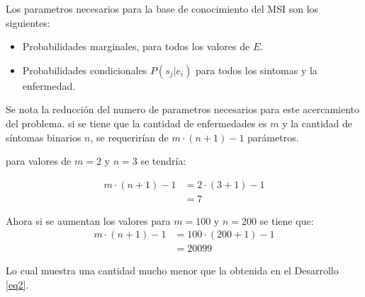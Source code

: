 \documentclass{article}
\begin{document}
Los parametros necesarios para la base de conocimiento del MSI son los
siguientes:
\begin{itemize}
	\item Probabilidades marginales, para todos los valores de $E$.
	\item Probabilidades condicionales $P(s_{j} | e_{i})$ para todos los sintomas
		y la enfermedad.
\end{itemize}

Se nota la reducción del numero de parametros necesarios para este acercamiento
del problema. si se tiene que la cantidad de enfermedades es $m$ y la cantidad
de síntomas binarios $n$, se requerirían de $m\cdot(n+1)-1$ parámetros.

para valores de $m=2$ y $n=3$ se tendría:

\begin{equation}
	\begin{split}
		m\cdot(n+1)-1 &= 2\cdot(3+1)-1 \\
		&= 7
	\end{split}
\end{equation}

Ahora si se aumentan los valores para $m=100$ y $n=200$ se tiene que:
\begin{equation}
	\begin{split}
		m\cdot(n+1)-1 &= 100\cdot(200+1)-1 \\
		&= 20099
	\end{split}
\end{equation}

Lo cual muestra una cantidad mucho menor que la obtenida en el Desarrollo
\ref{eq2}.
\newpage
\printbibliography[title={Referencias}]
\end{document}
